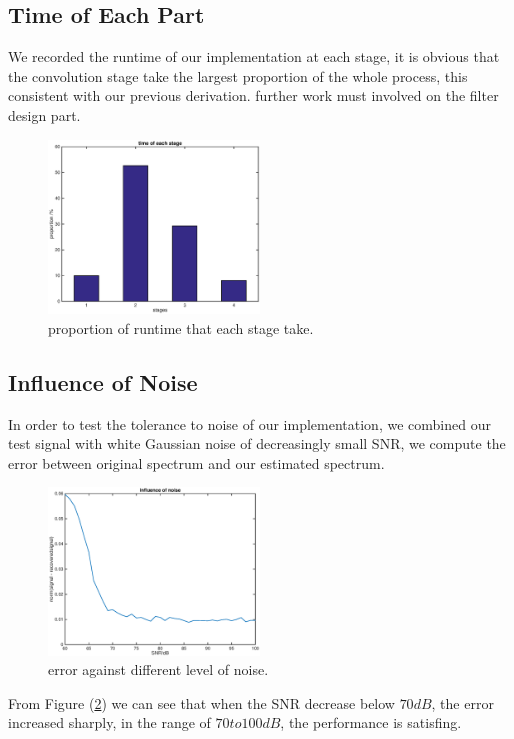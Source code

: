\documentclass[journal,transmag]{IEEEtran}
\begin{document}
\subsection{Time of Each Part}
We recorded the runtime of our implementation at each stage, it is obvious that the convolution stage take the largest proportion of the whole process, this consistent with our previous derivation. further work must involved on the filter design part.
\begin{figure}[htbp]
	\includegraphics[width=0.5\textwidth]{time}
	\caption{proportion of runtime that each stage take.}
	\label{time}
\end{figure}


\subsection{Influence of Noise}

In order to test the tolerance to noise of our implementation, we combined our test signal with white Gaussian noise of decreasingly small SNR, we compute the error between original spectrum and our estimated spectrum.

\begin{figure}[htbp]
	\includegraphics[width=0.5\textwidth]{influ_noise}
	\caption{error against different level of noise.}
	\label{noise}
\end{figure}

From Figure (\ref{noise}) we can see that when the SNR decrease below $70 dB$, the error increased sharply, in the range of $70 to 100 dB$, the performance is satisfing.
\end{document}
